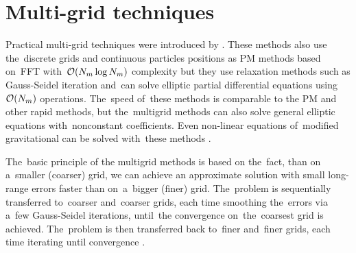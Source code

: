 \section{Multi-grid techniques}
Practical multi-grid techniques were introduced by \textcite{10.2307/2006422}. These methods also use the~discrete grids and continuous particles positions as PM methods based on~FFT with~$\mathcal{O}(N_m\log N_m)$ complexity but they use relaxation methods such as Gauss-Seidel iteration \parencite{doi:10.1002/zamm.19720520813} and~can solve elliptic partial differential equations using $\mathcal{O}(N_m)$ operations. The~speed of~these methods is comparable to the PM and other rapid methods, but the~multigrid methods can also solve general elliptic equations with~nonconstant coefficients. Even non-linear equations of~modified gravitational can be solved with~these methods \parencite{10.5555/42249}.

The~basic principle of the multigrid methods is based on the~fact, than on a~smaller (coarser) grid, we can achieve an approximate solution with small long-range errors faster than on~a~bigger (finer) grid. The~problem is sequentially transferred to~coarser and~coarser grids, each time smoothing the~errors via a~few Gauss-Seidel iterations, until~the convergence on~the~coarsest grid is achieved. The~problem is then transferred back to~finer and~finer grids, each time iterating until convergence \parencite{2011EPJP..126...55D}.

